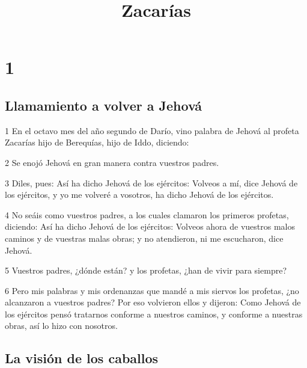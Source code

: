 

\title{Zacarías}

\chapter{1}

\section*{Llamamiento a volver a Jehová}

\par 1 En el octavo mes del año segundo de Darío, vino palabra de Jehová al profeta Zacarías hijo de Berequías, hijo de Iddo, diciendo:
\par 2 Se enojó Jehová en gran manera contra vuestros padres.
\par 3 Diles, pues: Así ha dicho Jehová de los ejércitos: Volveos a mí, dice Jehová de los ejércitos, y yo me volveré a vosotros, ha dicho Jehová de los ejércitos.
\par 4 No seáis como vuestros padres, a los cuales clamaron los primeros profetas, diciendo: Así ha dicho Jehová de los ejércitos: Volveos ahora de vuestros malos caminos y de vuestras malas obras; y no atendieron, ni me escucharon, dice Jehová.
\par 5 Vuestros padres, ¿dónde están? y los profetas, ¿han de vivir para siempre?
\par 6 Pero mis palabras y mis ordenanzas que mandé a mis siervos los profetas, ¿no alcanzaron a vuestros padres? Por eso volvieron ellos y dijeron: Como Jehová de los ejércitos pensó tratarnos conforme a nuestros caminos, y conforme a nuestras obras, así lo hizo con nosotros.

\section*{La visión de los caballos}

